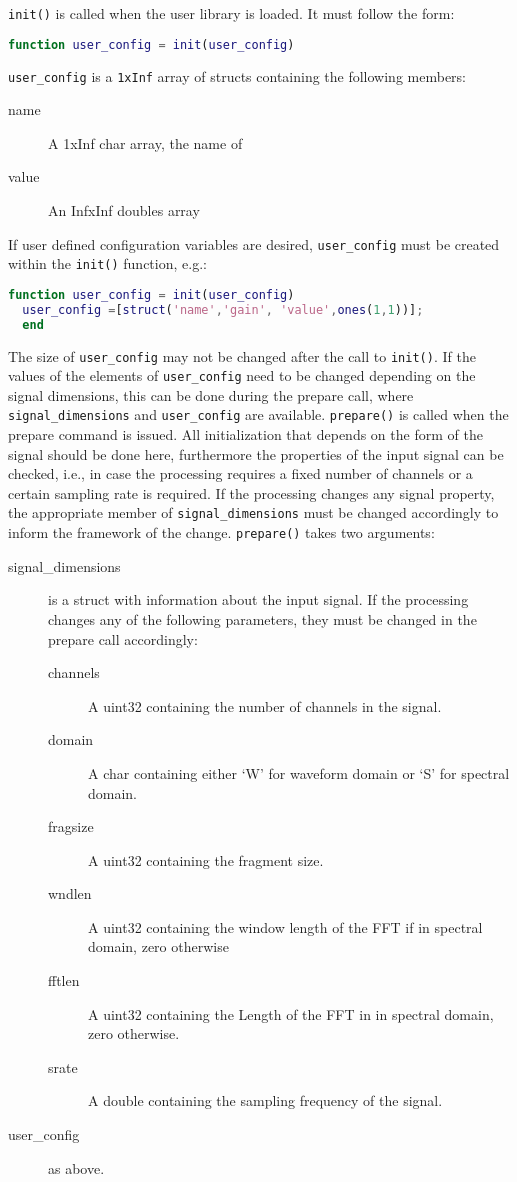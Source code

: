 \documentclass[11pt,a4paper,twoside]{article}
\newcommand{\+}{\discretionary{\mbox{\scriptsize$\hookleftarrow$}}{}{}}
\begin{document}
\texttt{init()} is called when the user library is loaded. It must follow the form:
\begin{lstlisting}[language=Matlab]
  function user_config = init(user_config)
\end{lstlisting}
\texttt{user\_config} is a \texttt{1xInf} array of structs containing the following members:
\begin{description}
\item[name] A 1xInf char array, the name of 
\item[value] An InfxInf doubles array
\end{description}
If user defined configuration variables are desired, \texttt{user\_config} must
be created within the \texttt{init()} function, e.g.:
\begin{lstlisting}[language=Matlab]
  function user_config = init(user_config)
  user_config =[struct('name','gain', 'value',ones(1,1))];
  end
\end{lstlisting}
The size of \texttt{user\_config} may not be changed after the call to \texttt{init()}. If the values of the
elements of \texttt{user\_config} need to be changed depending on the signal dimensions,
this can be done during the prepare call, where \texttt{signal\_dimensions} and \texttt{user\_config} are available.
\texttt{prepare()} is called when the prepare command is issued. All
initialization that depends on the form of the signal should be done here,
furthermore the properties of the input signal can be checked, i.e., in case the 
processing requires a fixed number of channels or a certain sampling rate is
required. If the processing changes any signal property, the
appropriate member of \texttt{signal\_dimensions} must be changed accordingly to
inform the \mha{} framework of the change.
\texttt{prepare()} takes two arguments:
  \begin{description}
  \item[signal\_dimensions] is a struct with information about the input signal.
    If the processing changes any of the following parameters,
    they must be changed in the prepare call accordingly:
    \begin{description}
    \item[channels] A uint32 containing the number of channels in the signal.
    \item[domain] A char containing either `W' for waveform domain or `S' for spectral domain. 
    \item[fragsize] A uint32 containing the fragment size.
    \item[wndlen] A uint32 containing the window length of the FFT if in spectral domain, zero otherwise
    \item[fftlen] A uint32 containing the Length of the FFT in in spectral domain, zero otherwise.
    \item[srate] A double containing the sampling frequency of the signal.
    \end{description}
  \item[user\_config] as above.
  \end{description}
\end{document}
